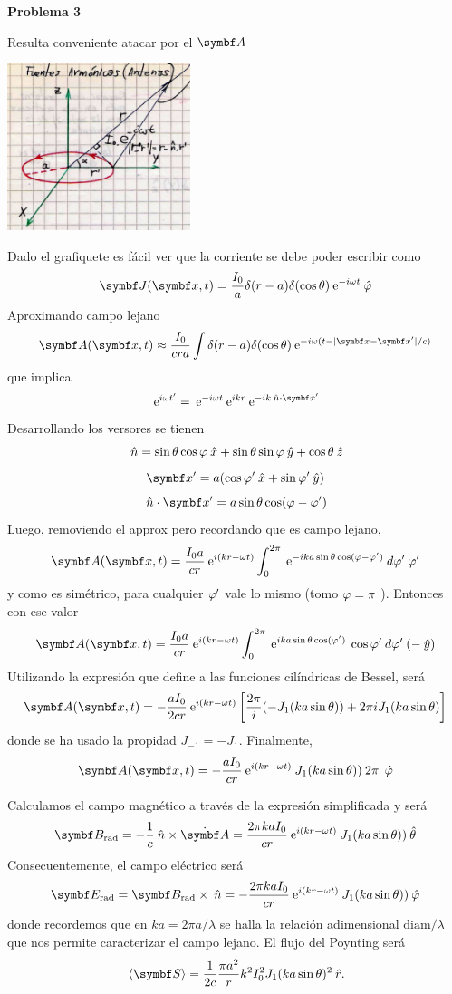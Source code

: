 \documentclass[10pt,oneside]{CBFT_book}
\begin{document}
\begin{ejemplo}{\bf Problema 3}
 
Resulta conveniente atacar por el $\vb A$ 

\includegraphics[width=0.4\textwidth]{images/fig_ft1_antena_problema3.jpg}

Dado el grafiquete es fácil ver que la corriente se debe poder escribir como
\[
	\vb{J}(\vbx,t) = \frac{I_0}{a}\delta(r-a)\delta(\cos\theta)\euler^{-i\omega t} \phiver
\]
Aproximando campo lejano
\[
	\vb{A}(\vbx,t) \approx \frac{I_0}{cra} \int \delta(r-a)\delta(\cos\theta) \euler^{-i\omega (t -|\vbx-\vbx'|/c)}
\]
que implica
\[
	\euler^{i\omega t'} = \euler^{-i\omega t} \euler^{ikr} \euler^{-i k \nver\cdot\vbx'}
\]
Desarrollando los versores se tienen
\[
	\:\hat{n} = \sin\theta\cos\varphi \:\hat{x} + \sin\theta\sin\varphi \:\hat{y} + \cos\theta \:\hat{z}
\]
\[
	\vbx' = a ( \cos\vp' \xver + \sin\vp' \yver )
\]
\[
	\nver \cdot \vbx' = a \sin\theta \cos(\vp-\vp')
\]
Luego, removiendo el approx pero recordando que es campo lejano,
\[
	\vb{A}(\vbx,t) =  \frac{I_0a}{cr} \euler^{i (kr-\omega t)} \int_0^{2\pi} 
	\euler^{-i k a \sin\theta \cos( \vp -\vp' )} \: d\vp' \: \vp'
\]
y como es simétrico, para cualquier $\varphi'$ vale lo mismo (tomo $\varphi=\pi$ ).
Entonces con ese valor
\[
	\vb{A}(\vbx,t) =  \frac{I_0a}{cr} \euler^{i (kr-\omega t)} \int_0^{2\pi} 
	\euler^{i k a \sin\theta \cos( \vp' )} \: \cos\vp' \: d\vp' \: (-\yver)
\]
Utilizando la expresión que define a las funciones cilíndricas de Bessel, será
\[
	\vb{A}(\vbx,t) = - \frac{aI_0}{2cr} \euler^{i (kr-\omega t)}
	\left[ 
	\frac{2\pi}{i} (-J_1(ka\sin\theta)) + 2\pi i J_1(ka\sin\theta)
	\right]
\]
donde se ha usado la propidad $ J_{-1} = -J_1 $. Finalmente,
\[
	\vb{A}(\vbx,t) = - \frac{aI_0}{cr} \euler^{i (kr-\omega t)}
	\: J_1(ka\sin\theta)) \: 2\pi \: \phiver
\]

Calculamos el campo magnético a través de la expresión simplificada y será
\[
	\vb B_{\text{rad}} = - \frac{1}{c} \nver \times \dot{\vb A} =
	\frac{2\pi ka I_0}{cr} \euler^{i(kr-\omega t)} \: J_1(ka\sin\theta)) \thetaver
\]
Consecuentemente, el campo eléctrico será
\[
	\vb E_{\text{rad}} = \vb B_{\text{rad}} \times \nver =
	-\frac{2\pi ka I_0}{cr} \euler^{i(kr-\omega t)} \: J_1(ka\sin\theta)) \phiver
\]
donde recordemos que en $ka=2\pi a/\lambda$ se halla la relación adimensional $\text{diam}/\lambda$
que nos permite caracterizar el campo lejano.
El flujo del Poynting será
\[
	\vm{\vb S} = \frac{1}{2c} \frac{\pi a^2}{r} k^2I_0^2 J_1(ka\sin\theta)^2 \rver.
\]


\end{ejemplo}
\end{document}

